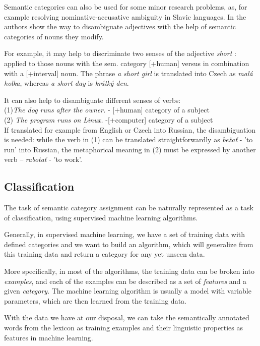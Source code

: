 \documentclass[letterpaper]{article}
\begin{document}
Semantic categories can also be used for some minor research problems, as, for example
resolving nominative-accusative ambiguity in Slavic languages.
In \cite{principled_disam} the authors show the way to disambiguate adjectives
with the help of semantic categories of nouns they modify. 

For example, it may help 
to discriminate two senses of the adjective \textit{short}
: applied to those nouns with the sem. category [+human] versus in combination
with a [+interval] noun. The phrase \textit{a short girl} is translated
into Czech as \textit{mal\'{a} holka}, whereas \textit{a short day} is \textit{kr\'{a}tk\'{y} den}.

It can also help to disambiguate different senses of verbs:\\ 
(1)\textit{The dog runs after the owner.} - [+human] category of a subject\\
(2) \textit{The program runs on Linux.} -[+computer] category of a subject \\
If translated for example from English or Czech into Russian, the disambiguation is needed:
while the verb in (1) can be translated straightforwardly as \textit{be\v{z}a\v{t}} - 'to run' into Russian,
the metaphorical meaning in (2) must be expressed by another verb -- \textit{rabota\v{t}} - 'to work'.

\subsection{Classification}
The task of semantic category assignment can be naturally represented as a task of classification, using supervised machine learning algorithms.

Generally, in supervised machine learning, we have a set of training data with defined 
categories and we want to build an algorithm, which will generalize from this training data and return a category for any yet unseen data.

More specifically, in most of the algorithms, the training data can be broken into
\textit{examples}, and each of the examples can be described as a set of \textit{features} and a given \textit{category}. The machine learning algorithm is usually a model with variable parameters, which are then learned from the training data.

With the data we have at our disposal, we can take the semantically annotated words from the lexicon as training examples 
and their linguistic properties as features in machine learning.
\end{document}
